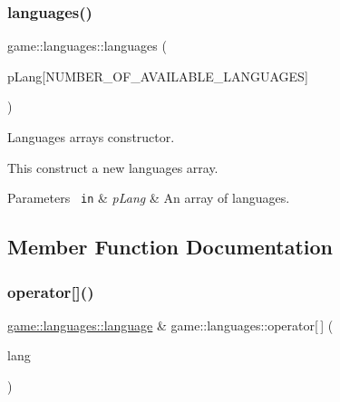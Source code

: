 \subsubsection{\texorpdfstring{languages()}{languages()}}
{\footnotesize\ttfamily game\+::languages\+::languages (\begin{DoxyParamCaption}\item[{const \mbox{\hyperlink{structgame_1_1languages_1_1language}{language}}(\&)}]{p\+Lang\mbox{[}\+N\+U\+M\+B\+E\+R\+\_\+\+O\+F\+\_\+\+A\+V\+A\+I\+L\+A\+B\+L\+E\+\_\+\+L\+A\+N\+G\+U\+A\+G\+E\+S\mbox{]} }\end{DoxyParamCaption})\hspace{0.3cm}{\ttfamily [noexcept]}}



Languages\textquotesingle{} array\textquotesingle{}s constructor. 

This construct a new languages\textquotesingle{} array.


\begin{DoxyParams}[1]{Parameters}
\mbox{\texttt{ in}}  & {\em p\+Lang} & An array of languages. \\
\hline
\end{DoxyParams}


\subsection{Member Function Documentation}
\mbox{\label{classgame_1_1languages_a8f26423a4e6cc1f3a0a6e386d9129a22}} 
\subsubsection{\texorpdfstring{operator[]()}{operator[]()}}
{\footnotesize\ttfamily \mbox{\hyperlink{structgame_1_1languages_1_1language}{game\+::languages\+::language}} \& game\+::languages\+::operator\mbox{[}$\,$\mbox{]} (\begin{DoxyParamCaption}\item[{\mbox{\hyperlink{classgame_1_1languages_ad965ce3a9fdce02ab3caba6301f221eb}{Available\+Languages}}}]{lang }\end{DoxyParamCaption})\hspace{0.3cm}{\ttfamily [noexcept]}}



